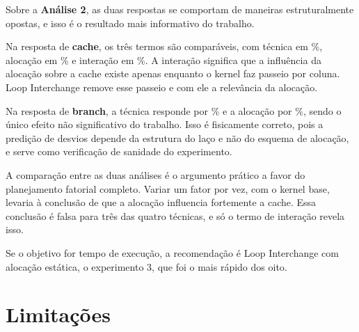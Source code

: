 \documentclass[11pt,a4paper]{article}
\begin{document}
Sobre a \textbf{Análise 2}, as duas respostas se comportam de maneiras estruturalmente
opostas, e isso é o resultado mais informativo do trabalho.

Na resposta de \textbf{cache}, os três termos são comparáveis, com técnica em
\valFatUmPctB\%, alocação em \valFatUmPctA\% e interação em \valFatUmPctAB\%. A interação
significa que a influência da alocação sobre a cache existe apenas enquanto o kernel faz
passeio por coluna. Loop Interchange remove esse passeio e com ele a relevância da
alocação.

Na resposta de \textbf{branch}, a técnica responde por \valFatDoisPctBP\% e a alocação por
\valFatDoisPctAP\%, sendo o único efeito não significativo do trabalho. Isso é
fisicamente correto, pois a predição de desvios depende da estrutura do laço e não do
esquema de alocação, e serve como verificação de sanidade do experimento.

A comparação entre as duas análises é o argumento prático a favor do planejamento
fatorial completo. Variar um fator por vez, com o kernel base, levaria à conclusão de que
a alocação influencia fortemente a cache. Essa conclusão é falsa para três das quatro
técnicas, e só o termo de interação revela isso.

Se o objetivo for tempo de execução, a recomendação é Loop Interchange com alocação
estática, o experimento 3, que foi o mais rápido dos oito.

\section{Limitações}
\end{document}
